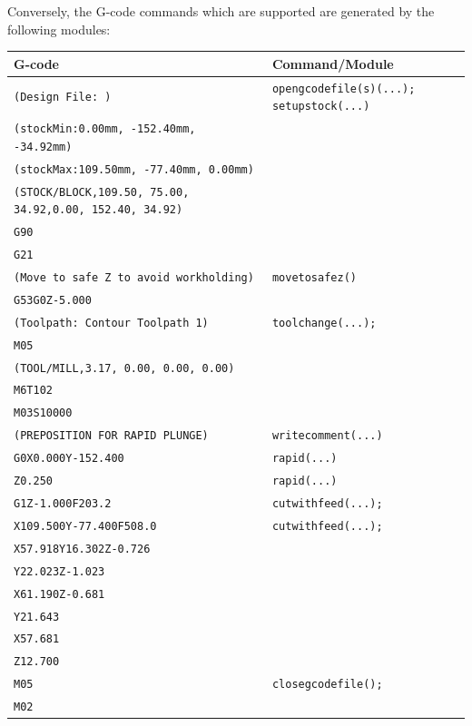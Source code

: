 \documentclass{ltxdoc}
\begin{document}
\noindent Conversely, the G-code commands which are supported are generated by the following modules:

\bigskip

\noindent \begin{tabular}{@{}ll@{}} \toprule
 G-code                                                           & Command/Module \\ \midrule
 \verb|(Design File: )| &  \texttt{opengcodefile(s)(...);}
                           \texttt{setupstock(...)}\\
 \verb|(stockMin:0.00mm, -152.40mm, -34.92mm)| \\
 \verb|(stockMax:109.50mm, -77.40mm, 0.00mm)| \\
 \verb|(STOCK/BLOCK,109.50, 75.00, 34.92,0.00, 152.40, 34.92)| \\
 \verb|G90| \\
 \verb|G21| \\ \midrule
 \verb|(Move to safe Z to avoid workholding)| &  \texttt{movetosafez()} \\
 \verb|G53G0Z-5.000| \\ \midrule
 \verb|(Toolpath: Contour Toolpath 1)| &  \texttt{toolchange(...);}\\
 \verb|M05| \\
 \verb|(TOOL/MILL,3.17, 0.00, 0.00, 0.00)| \\
 \verb|M6T102| \\
 \verb|M03S10000|  \\ \midrule
 \verb|(PREPOSITION FOR RAPID PLUNGE)| & \texttt{writecomment(...)}\\ \midrule
 \verb|G0X0.000Y-152.400| & \texttt{rapid(...)}\\
 \verb|Z0.250| & \texttt{rapid(...)}\\ \midrule
 \verb|G1Z-1.000F203.2| & \texttt{cutwithfeed(...);}\\  
 \verb|X109.500Y-77.400F508.0| & \texttt{cutwithfeed(...);} \\ 
 \verb|X57.918Y16.302Z-0.726|\\ 
 \verb|Y22.023Z-1.023|\\ 
 \verb|X61.190Z-0.681|\\ 
 \verb|Y21.643|\\ 
 \verb|X57.681|\\
 \verb|Z12.700|\\ \midrule
 \verb|M05| &  \texttt{closegcodefile();}\\
 \verb|M02|\\
 \bottomrule
 \end{tabular}
\bigskip
\end{document}
